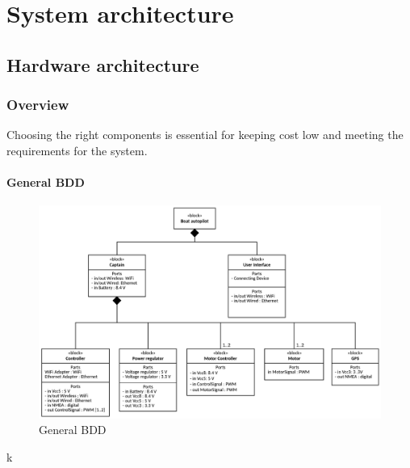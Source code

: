 \chapter{System architecture}

\section{Hardware architecture}
\subsection{Overview}

Choosing the right components is essential for keeping cost low and meeting the requirements for the system.



\subsubsection{General BDD}
\begin{figure}[H]
	\centering
	\includegraphics[width=1\linewidth]{Images/System_architecture/General_BDD}
	\caption{General BDD}
\end{figure}

k

